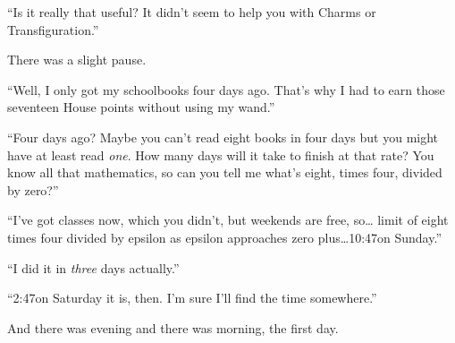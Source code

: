 “Is it really that useful? It didn’t seem to help you with Charms or Transfiguration.”

There was a slight pause.

“Well, I only got my schoolbooks four days ago. That’s why I had to earn those seventeen House points without using my wand.”

“Four days ago? Maybe you can’t read eight books in four days but you might have at least read \emph{one}. How many days will it take to finish at that rate? You know all that mathematics, so can you tell me what’s eight, times four, divided by zero?”

“I’ve got classes now, which you didn’t, but weekends are free, so… limit of eight times four divided by epsilon as epsilon approaches zero plus…10:47\AM on Sunday.”

“I did it in \emph{three} days actually.”

“2:47\PM on Saturday it is, then. I’m sure I’ll find the time somewhere.”

And there was evening and there was morning, the first day.
